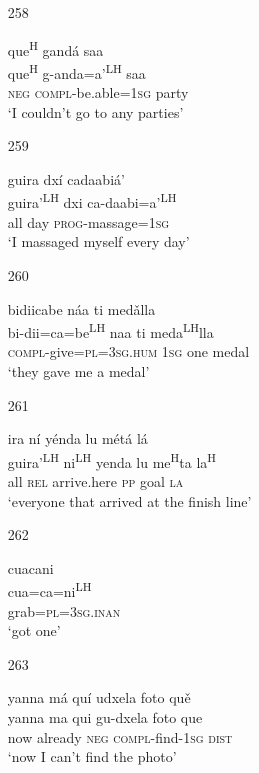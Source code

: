 \begin{itemize}
\item[258]
 
\glll   que\textsuperscript{H} gand\'{a} saa\\
que\textsuperscript{H} g-anda=a'\textsuperscript{LH} saa\\
\textsc{neg} \textsc{compl}-be.able=\textsc{1sg} party\\
\glt `I couldn't go to any parties'
 


\item[259]
 
\glll   guira dx\'{i} cadaabi\'{a}'\\
guira'\textsuperscript{LH} dxi ca-daabi=a'\textsuperscript{LH}\\
all day \textsc{prog}-massage=\textsc{1sg}\\
\glt `I massaged myself every day'
 



\item[260]
 
\glll   bidiicabe n\'{a}a ti med\v{a}lla\\
bi-dii=ca=be\textsuperscript{LH} naa ti meda\textsuperscript{LH}lla\\
\textsc{compl}-give=\textsc{pl}=\textsc{3sg.hum} \textsc{1sg} one medal\\
\glt `they gave me a medal'
 



\item[261]
 
\glll   ira n\'{i} y\'{e}nda lu m\'{e}t\'{a} l\'{a} \\
guira'\textsuperscript{LH} ni\textsuperscript{LH} yenda lu me\textsuperscript{H}ta la\textsuperscript{H}\\
all \textsc{rel} arrive.here \textsc{pp} goal \textsc{la}\\
\glt `everyone that arrived at the finish line'
 


\item[262]
 
\glll   cuacani \\
cua=ca=ni\textsuperscript{LH}\\
grab=\textsc{pl}=\textsc{3sg.inan}\\
\glt `got one'
 


\item[263]
 
\glll   yanna m\'{a} qu\'{i} udxela foto qu\v{e}\\
yanna ma qui gu-dxela foto que\\
now already \textsc{neg} \textsc{compl}-find-\textsc{1sg} \textsc{dist}\\
\glt `now I can't find the photo'
 



\end{itemize}
